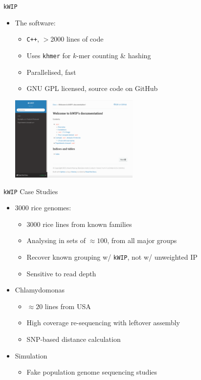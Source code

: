 \documentclass[t]{beamer}
\begin{document}
\begin{frame}{\texttt{kWIP}}
  \begin{itemize}
    \item The software:
      \begin{itemize}
        \item \texttt{C++}, $>$2000 lines of code
        \item Uses \texttt{khmer} for $k$-mer counting \& hashing
        \item Parallelised, fast
        \item GNU GPL licensed, source code on GitHub
      \end{itemize}
      \begin{center}
        \includegraphics[width=0.5\textwidth]{img/kwip-doc-screenshot.png}
      \end{center}
  \end{itemize}
\end{frame}

\begin{frame}{\texttt{kWIP} Case Studies}
  \begin{itemize}
    \item 3000 rice genomes:
      \begin{itemize}
        \item 3000 rice lines from known families
          \autocite{the_3000_rice_genomes_project_3000_2014}
        \item Analysing in sets of $\approx 100$, from all major groups
        \item Recover known grouping w/ \texttt{kWIP}, not w/ unweighted IP
        \item Sensitive to read depth
      \end{itemize}
    \item Chlamydomonas
      \begin{itemize}
        \item $\approx 20$ lines from USA
        \item High coverage re-sequencing with leftover assembly
        \item SNP-based distance calculation
      \end{itemize}
    \item Simulation
      \begin{itemize}
        \item Fake population genome sequencing studies
      \end{itemize}
  \end{itemize}
\end{frame}
\end{document}
